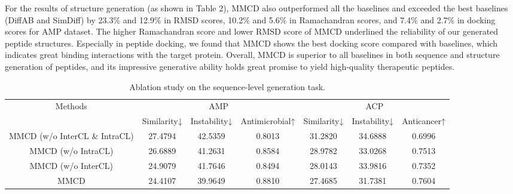 \documentclass[letterpaper]{article} %
\begin{document}
For the results of structure generation (as shown in Table 2), MMCD also outperformed all the baselines and exceeded the best baselines (DiffAB and SimDiff) by 23.3$\%$ and 12.9$\%$ in RMSD scores, 10.2$\%$ and 5.6$\%$ in Ramachandran scores, and 7.4$\%$ and 2.7$\%$ in docking scores for AMP dataset. The higher Ramachandran score and lower RMSD score of MMCD underlined the reliability of our generated peptide structures. Especially in peptide docking, we found that MMCD shows the best docking score compared with baselines, which indicates great binding interactions with the target protein. Overall, MMCD is superior to all baselines in both sequence and structure generation of peptides, and its impressive generative ability holds great promise to yield high-quality therapeutic peptides.

\begin{table}[ht]
\centering
\setlength{\tabcolsep}{6pt}
\begin{tabular}{ccccccc}
\hline
\multirow{2}{*}{Methods} & \multicolumn{3}{c}{AMP}                     & \multicolumn{3}{c}{ACP}                  \\ \cmidrule(r){2-4} \cmidrule(r){5-7}
                         & Similarity↓ & Instability↓ & Antimicrobial↑ & Similarity↓ & Instability↓ & Anticancer↑ \\ \hline
MMCD (w/o InterCL \& IntraCL)  & 27.4794     & 42.5359      & 0.8013         & 31.2820     & 34.6888      & 0.6996      \\
MMCD (w/o IntraCL)             & 26.6889     & 41.2631      & 0.8584         & 28.9782     & 33.0268      & 0.7513      \\
MMCD (w/o InterCL)             & 24.9079     & 41.7646      & 0.8494         & 28.0143     & 33.9816      & 0.7352      \\
MMCD                           & 24.4107     & 39.9649      & 0.8810         & 27.4685     & 31.7381      & 0.7604      \\ \hline
\end{tabular}
\caption{Ablation study on the sequence-level generation task.}
\end{table}
\end{document}
